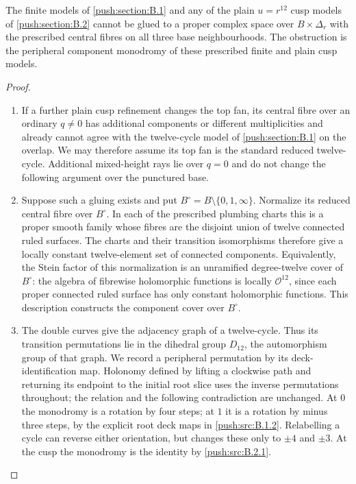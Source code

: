 \begin{theorem}\hypertarget{tag-0305}{}\label{push:src:B.3.1}\label{push:B31}

The finite models of \ref{push:section:B.1} and any of the plain
$u=r^{12}$ cusp models of \ref{push:section:B.2} cannot be glued to a
proper complex space over $B\times\Delta_r$ with
the prescribed central fibres on all three base
neighbourhoods. The obstruction is the peripheral component
monodromy of these prescribed finite and plain cusp models.
\end{theorem}


\begin{proof}
\begin{enumerate}[label=\arabic*.,leftmargin=*]
\item If a further plain cusp refinement changes the top fan,
its central fibre over an ordinary $q\ne0$ has additional
components or different multiplicities and already cannot
agree with the twelve-cycle model of \ref{push:section:B.1} on the overlap.
We may therefore assume its top fan is the standard reduced
twelve-cycle. Additional mixed-height rays lie over $q=0$
and do not change the following argument over the punctured
base.

\item Suppose such a gluing exists and put
$B^\circ=B\setminus\{0,1,\infty\}$. Normalize
its reduced central fibre over $B^\circ$. In
each of the prescribed plumbing charts this is
a proper smooth family whose fibres are the
disjoint union of twelve connected ruled
surfaces. The charts and their transition
isomorphisms therefore give a locally constant
twelve-element set of connected components.
Equivalently, the Stein factor of this
normalization is an unramified degree-twelve
cover of $B^\circ$: the algebra of fibrewise
holomorphic functions is locally $\mathcal O^{12}$,
since each proper connected ruled surface has
only constant holomorphic functions. This description constructs the component cover over
$B^\circ$.

\item The double curves give the adjacency graph of
a twelve-cycle. Thus its transition
permutations lie in the dihedral group
$D_{12}$, the automorphism group of that graph.
We record a peripheral permutation by its
deck-identification map. Holonomy defined by
lifting a clockwise path and returning its
endpoint to the initial root slice uses the
inverse permutations throughout; the relation
and the following contradiction are unchanged.
At $0$ the monodromy is a rotation by four
steps; at $1$ it is a rotation by minus three
steps, by the explicit root deck maps in
\ref{push:src:B.1.2}. Relabelling a cycle can reverse either
orientation, but changes these only to
$\pm4$ and $\pm3$. At the cusp the
monodromy is the identity by \ref{push:src:B.2.1}.


\end{enumerate}
\end{proof}
